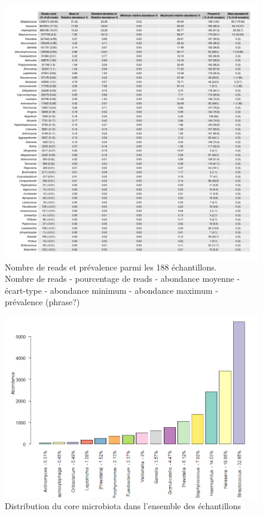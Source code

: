 \documentclass[12pt,a4paper]{article}
\begin{document}
\begin{figure}
\begin{center}
\includegraphics[scale=0.4]{img/alld.png}\hfill
\end{center}
\caption{Nombre de reads et prévalence parmi les 188 échantillons.\\ Nombre de reads - pourcentage de reads - abondance moyenne - écart-type - abondance minimum - abondance maximum - prévalence (phrase?)}
\label{alltable}
\end{figure}


\begin{figure}[t]
\begin{center}
\includegraphics[scale=0.5]{img/core.png}\hfill
\end{center}
\caption{Distribution du core microbiota dans l'ensemble des échantillons}
\label{core}
\end{figure}
\end{document}
